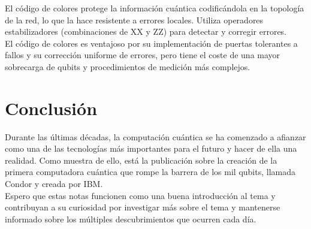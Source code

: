 El código de colores protege la información cuántica codificándola en la topología de la red, lo que la hace resistente a errores locales. Utiliza operadores estabilizadores (combinaciones de XX y ZZ) para detectar y corregir errores.\\

El código de colores es ventajoso por su implementación de puertas tolerantes a fallos y su corrección uniforme de errores, pero tiene el coste de una mayor sobrecarga de qubits y procedimientos de medición más complejos. 

\section{Conclusión}

Durante las últimas décadas, la computación cuántica se ha comenzado a afianzar como una de las tecnologías más importantes para el futuro y hacer de ella una realidad. Como muestra de ello, está la publicación sobre la creación de la primera computadora cuántica que rompe la barrera de los mil qubits, llamada Condor y creada por IBM.\\

Espero que estas notas funcionen como una buena introducción al tema y contribuyan a su curiosidad por investigar más sobre el tema y mantenerse informado sobre los múltiples descubrimientos que ocurren cada día.
